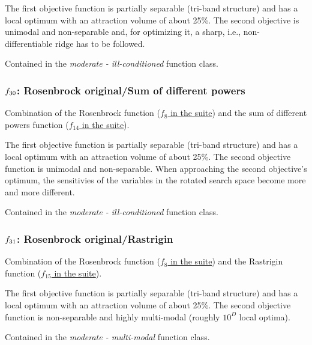 \documentclass[letterpaper,12pt,english]{article}
\begin{document}
The first objective function is partially separable (tri-band structure)
and has a local optimum with an attraction volume of about 25\%.
The second objective is unimodal and non-separable and, for
optimizing it, a sharp, i.e., non-differentiable ridge has to be followed.

Contained in the \emph{moderate - ill-conditioned} function class.


\subsubsection{\protect\(f_{30}\protect\): Rosenbrock original/Sum of different powers}
\label{index:f30}\label{index:rosenbrock-original-sum-of-different-powers}
Combination of the Rosenbrock function (\href{http://coco.lri.fr/downloads/download15.03/bbobdocfunctions.pdf\#page=40}{\(f_8\) in the  suite}) and the sum of different powers function
(\href{http://coco.lri.fr/downloads/download15.03/bbobdocfunctions.pdf\#page=70}{\(f_{14}\) in the  suite}).

The first objective function is partially separable (tri-band structure)
and has a local optimum with an attraction volume of about 25\%.
The second objective function is unimodal and non-separable. When
approaching the second objective's optimum, the sensitivies of the
variables in the rotated search space become more and more different.

Contained in the \emph{moderate - ill-conditioned} function class.


\subsubsection{\protect\(f_{31}\protect\): Rosenbrock original/Rastrigin}
\label{index:f31}\label{index:rosenbrock-original-rastrigin}
Combination of the Rosenbrock function (\href{http://coco.lri.fr/downloads/download15.03/bbobdocfunctions.pdf\#page=40}{\(f_8\) in the  suite}) and the Rastrigin function
(\href{http://coco.lri.fr/downloads/download15.03/bbobdocfunctions.pdf\#page=75}{\(f_{15}\) in the  suite}).

The first objective function is partially separable (tri-band structure)
and has a local optimum with an attraction volume of about 25\%.
The second objective function is non-separable and
highly multi-modal (roughly \(10^D\) local
optima).

Contained in the \emph{moderate - multi-modal} function class.
\end{document}
